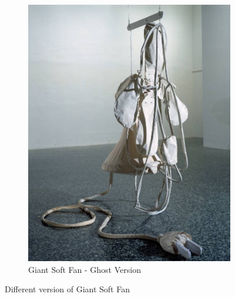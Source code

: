 \documentclass[12pt]{article}
\begin{document}
\begin{figure}
\begin{subfigure}{0.5\textwidth}
        \includegraphics[height=.4\textheight]{fan2.jpeg}
        \centering
        \caption{Giant Soft Fan - Ghost Version \autocite{pic3}}
    \end{subfigure}
    \caption{Different version of Giant Soft Fan} 
    \label{fig:fan}
\end{figure}
\end{document}
